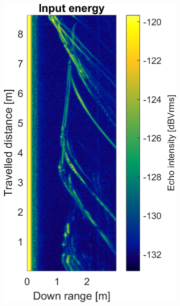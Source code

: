 \begin{figure}[htbp]
    \centering
    \begin{subfigure}[t]{0.475\linewidth}
        \centering
        \includegraphics[width=\linewidth,max height=.475\textheight]{gfx/results/underground_input.png}
    \end{subfigure}%
    \hfill%
    \begin{subfigure}[t]{0.475\linewidth}
        \centering

\end{subfigure}
\end{figure}
